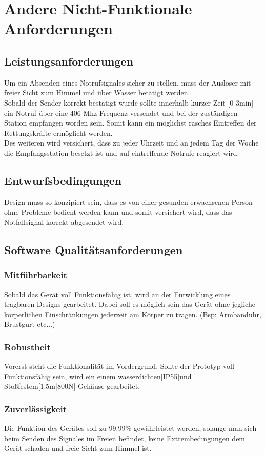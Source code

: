 \newpage

\section{Andere Nicht-Funktionale Anforderungen}

\subsection{Leistungsanforderungen}
Um ein Absenden eines Notrufsignales sicher zu stellen, muss der Auslöser mit freier Sicht zum Himmel und über Wasser
betätigt werden. \\
Sobald der Sender korrekt bestätigt wurde sollte innerhalb kurzer Zeit [0-3min] ein Notruf über
eine 406 Mhz Frequenz versendet und bei der zuständigen Station empfangen worden sein. Somit kann ein möglichst rasches Eintreffen der Rettungskräfte ermöglicht werden.\\
Des weiteren wird versichert, dass zu jeder Uhrzeit und an jedem Tag der Woche die Empfangsstation besetzt ist und 
auf eintreffende Notrufe reagiert wird.

\subsection{Entwurfsbedingungen}
Design muss so konzipiert sein, dass es von einer gesunden erwachsenen Person ohne Probleme bedient werden kann und 
somit versichert wird, dass das Notfallsignal korrekt abgesendet wird.
\subsection{Software Qualitätsanforderungen}
\subsubsection{Mitführbarkeit}
Sobald das Gerät voll Funktionsfähig ist, wird an der Entwicklung eines tragbaren Designs gearbeitet. Dabei
soll es möglich sein das Gerät ohne jegliche körperlichen Einschränkungen jederzeit am Körper zu tragen.
(Bsp: Armbanduhr, Brustgurt etc...)
\subsubsection{Robustheit}
Vorerst steht die Funktionalität im Vordergrund. Sollte der Prototyp voll Funktionsfähig sein, wird ein einem
wasserdichten[IP55]und Stoßfestem[1.5m|800N] Gehäuse gearbeitet.
\subsubsection{Zuverlässigkeit}
Die Funktion des Gerätes soll zu 99.99{\%} gewährleistet werden, solange man sich beim Senden des Signales im Freien 
befindet, keine Extrembedingungen dem Gerät schaden und freie Sicht zum Himmel ist.

